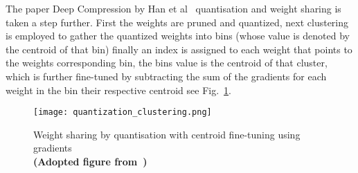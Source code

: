\documentclass[../../D1.tex]{subfiles}
\begin{document}
The paper Deep Compression by Han et al~\autocite{hanDeepCompressionCompressing2016} quantisation and weight sharing is taken a step further.
First the weights are pruned and quantized, next clustering is employed to gather the quantized weights into bins (whose value is denoted by the centroid of that bin) finally an index is assigned to each weight that points to the weights corresponding bin, the bins value is the centroid of that cluster, which is further fine-tuned by subtracting the sum of the gradients for each weight in the bin their respective centroid see Fig.~\ref{fig:QuantisationClust}.  

\begin{figure}[H]
    \begin{center}
        \texttt{[image: quantization\_clustering.png]} 
    \end{center}
    
    \caption{Weight sharing by quantisation with centroid fine-tuning using gradients\\ \textbf{(Adopted figure from~\autocite{hanDeepCompressionCompressing2016})}}
    \label{fig:QuantisationClust}   
\end{figure}
\end{document}
